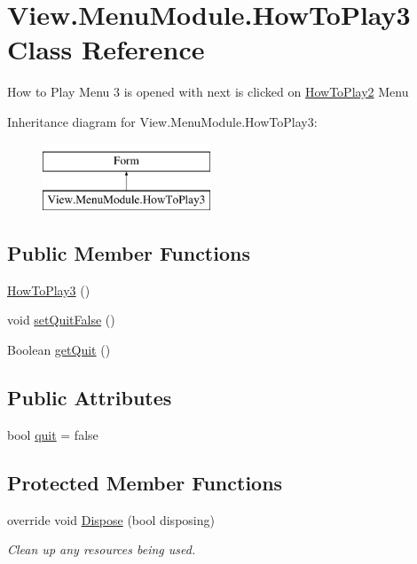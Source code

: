 \hypertarget{class_view_1_1_menu_module_1_1_how_to_play3}{}\section{View.\+Menu\+Module.\+How\+To\+Play3 Class Reference}
\label{class_view_1_1_menu_module_1_1_how_to_play3}


How to Play Menu 3 is opened with next is clicked on \hyperlink{class_view_1_1_menu_module_1_1_how_to_play2}{How\+To\+Play2} Menu  


Inheritance diagram for View.\+Menu\+Module.\+How\+To\+Play3\+:\begin{figure}[H]
\begin{center}
\leavevmode
\includegraphics[height=2.000000cm]{class_view_1_1_menu_module_1_1_how_to_play3}
\end{center}
\end{figure}
\subsection*{Public Member Functions}
\begin{DoxyCompactItemize}
\item 
\hyperlink{class_view_1_1_menu_module_1_1_how_to_play3_ad513e8bee12c26650d728609e59b208d}{How\+To\+Play3} ()
\item 
void \hyperlink{class_view_1_1_menu_module_1_1_how_to_play3_a7fd292034475f8a0fcb57a401808d043}{set\+Quit\+False} ()
\item 
Boolean \hyperlink{class_view_1_1_menu_module_1_1_how_to_play3_a32b39a8045e75e8cae4c94677d1be020}{get\+Quit} ()
\end{DoxyCompactItemize}
\subsection*{Public Attributes}
\begin{DoxyCompactItemize}
\item 
bool \hyperlink{class_view_1_1_menu_module_1_1_how_to_play3_a67ceaf31171526b8fab29a36094e983d}{quit} = false
\end{DoxyCompactItemize}
\subsection*{Protected Member Functions}
\begin{DoxyCompactItemize}
\item 
override void \hyperlink{class_view_1_1_menu_module_1_1_how_to_play3_a8335930fd58168dbcc5eddc120829d60}{Dispose} (bool disposing)
\begin{DoxyCompactList}\small\item\em Clean up any resources being used. \end{DoxyCompactList}\end{DoxyCompactItemize}


